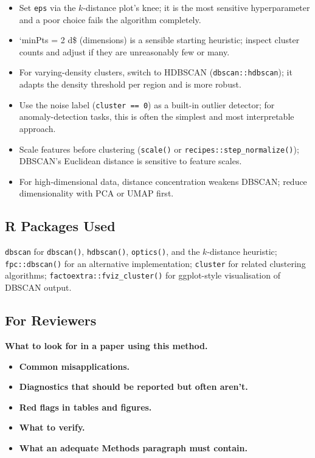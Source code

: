 \documentclass[
]{article}
\providecommand{\tightlist}{%
  \setlength{\itemsep}{0pt}\setlength{\parskip}{0pt}}
\begin{document}
\begin{itemize}
\tightlist
\item
  Set \texttt{eps} via the \(k\)-distance plot's knee; it is the most
  sensitive hyperparameter and a poor choice fails the algorithm
  completely.
\item
  `minPts = 2 \times d\$ (dimensions) is a sensible starting heuristic;
  inspect cluster counts and adjust if they are unreasonably few or
  many.
\item
  For varying-density clusters, switch to HDBSCAN
  (\texttt{dbscan::hdbscan}); it adapts the density threshold per region
  and is more robust.
\item
  Use the noise label (\texttt{cluster\ ==\ 0}) as a built-in outlier
  detector; for anomaly-detection tasks, this is often the simplest and
  most interpretable approach.
\item
  Scale features before clustering (\texttt{scale()} or
  \texttt{recipes::step\_normalize()}); DBSCAN's Euclidean distance is
  sensitive to feature scales.
\item
  For high-dimensional data, distance concentration weakens DBSCAN;
  reduce dimensionality with PCA or UMAP first.
\end{itemize}

\subsection{R Packages Used}\label{r-packages-used}

\texttt{dbscan} for \texttt{dbscan()}, \texttt{hdbscan()},
\texttt{optics()}, and the \(k\)-distance heuristic;
\texttt{fpc::dbscan()} for an alternative implementation;
\texttt{cluster} for related clustering algorithms;
\texttt{factoextra::fviz\_cluster()} for ggplot-style visualisation of
DBSCAN output.

\subsection{For Reviewers}\label{for-reviewers}

\textbf{What to look for in a paper using this method.}

\begin{itemize}
\tightlist
\item
  \textbf{Common misapplications.}
\item
  \textbf{Diagnostics that should be reported but often aren't.}
\item
  \textbf{Red flags in tables and figures.}
\item
  \textbf{What to verify.}
\item
  \textbf{What an adequate Methods paragraph must contain.}
\end{itemize}
\end{document}
